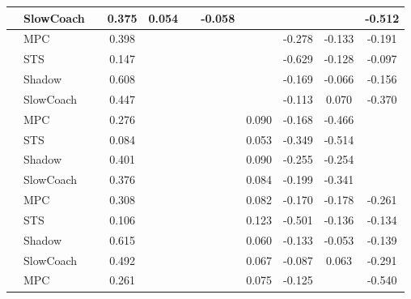 \begin{tabular}{|l|l|*{9}{c|}}
                                                           & SlowCoach &       &     0.375 &     0.054 &     & -0.058 &     &      &      &   -0.512 \\
\midrule
[False, True, False, False, False, False, True, True, True] & MPC &       &     0.398 &        &     &     &     &  -0.278 &  -0.133 &   -0.191 \\
                                                           & STS &       &     0.147 &        &     &     &     &  -0.629 &  -0.128 &   -0.097 \\
                                                           & Shadow &       &     0.608 &        &     &     &     &  -0.169 &  -0.066 &   -0.156 \\
                                                           & SlowCoach &       &     0.447 &        &     &     &     &  -0.113 &   0.070 &   -0.370 \\
\midrule
[False, True, False, False, False, True, True, True, False] & MPC &       &     0.276 &        &     &     &  0.090 &  -0.168 &  -0.466 &       \\
                                                           & STS &       &     0.084 &        &     &     &  0.053 &  -0.349 &  -0.514 &       \\
                                                           & Shadow &       &     0.401 &        &     &     &  0.090 &  -0.255 &  -0.254 &       \\
                                                           & SlowCoach &       &     0.376 &        &     &     &  0.084 &  -0.199 &  -0.341 &       \\
\midrule
[False, True, False, False, False, True, True, True, True] & MPC &       &     0.308 &        &     &     &  0.082 &  -0.170 &  -0.178 &   -0.261 \\
                                                           & STS &       &     0.106 &        &     &     &  0.123 &  -0.501 &  -0.136 &   -0.134 \\
                                                           & Shadow &       &     0.615 &        &     &     &  0.060 &  -0.133 &  -0.053 &   -0.139 \\
                                                           & SlowCoach &       &     0.492 &        &     &     &  0.067 &  -0.087 &   0.063 &   -0.291 \\
\midrule
[False, True, False, False, False, True, True, False, True] & MPC &       &     0.261 &        &     &     &  0.075 &  -0.125 &      &   -0.540 \\

\end{tabular}
